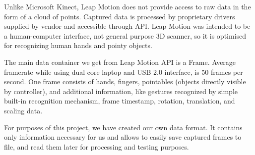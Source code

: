 Unlike Microsoft Kinect, Leap Motion does not provide access to raw data in the form of a cloud of points. Captured data is processed by proprietary drivers supplied by vendor and accessible through API. Leap Motion was intended to be a human-computer interface, not general purpose 3D scanner, so it is optimised for recognizing human hands and pointy objects.

The main data container we get from Leap Motion API is a Frame. Average framerate while using dual core laptop and USB 2.0 interface, is 50 frames per second. One frame consists of hands, fingers, pointables (objects directly visible by controller), and additional information, like gestures recognized by simple built-in recognition mechanism, frame timestamp, rotation, translation, and scaling data. 

For purposes of this project, we have created our own data format. It contains only information necessary for us and allows to easily save captured frames to file, and read them later for processing and testing purposes.
